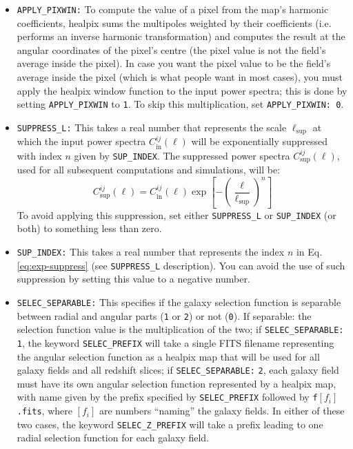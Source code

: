 \documentclass[12pt]{book} %
\newcommand{\nv}[1]{\mathrm{#1}}                 %
\begin{document}
\begin{itemize}
\item {\tt APPLY\_PIXWIN:} To compute the value of a pixel from the map's harmonic coefficients, 
  {\sc healpix} sums the multipoles weighted by their coefficients (i.e. performs an inverse 
  harmonic transformation) and computes the result at the angular coordinates of the pixel's 
  centre (the pixel value is not the field's average inside the pixel). In case you want the pixel 
  value to be the field's average inside the pixel (which is what people want in most cases), 
  you must apply the {\sc healpix} window function 
  to the input power spectra; this is done by setting {\tt APPLY\_PIXWIN} to {\tt 1}. To skip 
  this multiplication, set {\tt APPLY\_PIXWIN: 0}.

\item {\tt SUPPRESS\_L:} This takes a real number that represents the scale $\ell_{\nv{sup}}$ 
  at which the input power spectra $C_{\nv{in}}^{ij}(\ell)$ will be exponentially suppressed 
  with index $n$ given by {\tt SUP\_INDEX}. The suppressed power spectra $C_{\nv{sup}}^{ij}(\ell)$, 
  used for all subsequent computations and simulations, will be: 
  \begin{equation}
    C_{\nv{sup}}^{ij}(\ell) = C_{\nv{in}}^{ij}(\ell) \exp \left[ - \left(\frac{\ell}{\ell_{\nv{sup}}}\right)^n\right]
    \label{eq:exp-suppress}
  \end{equation}
  To avoid applying this suppression, set either {\tt SUPPRESS\_L} or {\tt SUP\_INDEX} (or both) 
  to something less than zero.

\item {\tt SUP\_INDEX:} This takes a real number that represents the index $n$ in Eq. 
  \ref{eq:exp-suppress} (see {\tt SUPPRESS\_L} description). You can avoid the use 
  of such suppression by setting this value to a negative number.

\item {\tt SELEC\_SEPARABLE:} This specifies if the galaxy selection function is separable between 
  radial and angular parts ({\tt 1} or {\tt 2}) or not ({\tt 0}). If separable: the selection function value is 
  the multiplication of the two; if {\tt SELEC\_SEPARABLE:} {\tt 1}, the keyword {\tt SELEC\_PREFIX} 
  will take a single FITS filename representing the angular selection function 
  as a {\sc healpix} map that will be used for all galaxy fields and all redshift slices; 
  if {\tt SELEC\_SEPARABLE:} {\tt 2}, each galaxy field must have its own angular selection function 
  represented by a {\sc healpix} map, with name given by the prefix specified by {\tt SELEC\_PREFIX} followed 
  by {\tt f}$[f_i]${\tt.fits}, where $[f_i]$ are numbers ``naming'' the galaxy fields. In either of these two cases, the 
  keyword {\tt SELEC\_Z\_PREFIX} will take a prefix leading to one radial selection function for each 
  galaxy field. 


\end{itemize}
\end{document}
